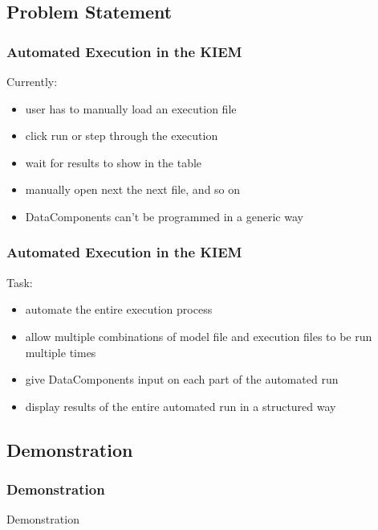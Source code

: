 \subsection{Problem Statement}
\begin{frame}[fragile]
\frametitle{Automated Execution in the KIEM}
Currently:
  \begin{itemize}
   \item user has to manually load an execution file
 \item click run or step through the execution
 \item wait for results to show in the table
\item manually open next the next file, and so on
    \item DataComponents can't be programmed in a generic way
  \end{itemize}
\end{frame}

\begin{frame}[fragile]
\frametitle{Automated Execution in the KIEM}
Task:
  \begin{itemize}
   \item automate the entire execution process
    \item allow multiple combinations of model file and execution files to be run multiple 
times
    \item give DataComponents input on each part of the automated run
    \item display results of the entire automated run in a structured way
  \end{itemize}
\end{frame}

\subsection{Demonstration}
\begin{frame}[fragile]
\frametitle{Demonstration}
Demonstration
\end{frame}


